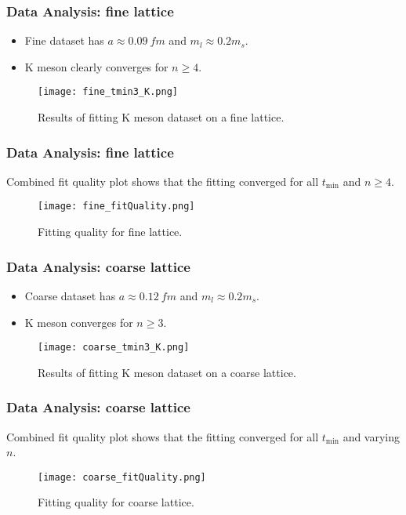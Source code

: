 \documentclass{beamer}
\begin{document}
\begin{frame}
    \frametitle{Data Analysis: fine lattice}
    \begin{itemize}
        \item Fine dataset has $a \approx \SI{0.09}{fm}$ and $m_l \approx 0.2 m_s$.
        \item K meson clearly converges for $n \geq 4$.
    \end{itemize}
    \begin{figure}
        \centering
        \texttt{[image: fine\_tmin3\_K.png]}
        \caption{Results of fitting K meson dataset on a fine lattice.}
    \end{figure}
\end{frame}

\begin{frame}
    \frametitle{Data Analysis: fine lattice}
    Combined fit quality plot shows that the fitting converged for all $t_\mathrm{min}$ and $n \geq 4$.
    \begin{figure}
        \centering
        \texttt{[image: fine\_fitQuality.png]}
        \caption{Fitting quality for fine lattice.}
    \end{figure}
\end{frame}

\begin{frame}
    \frametitle{Data Analysis: coarse lattice}
    \begin{itemize}
        \item Coarse dataset has $a \approx \SI{0.12}{fm}$ and $m_l \approx 0.2 m_s$.
        \item K meson converges for $n \geq 3$.
    \end{itemize}
    \begin{figure}
        \centering
        \texttt{[image: coarse\_tmin3\_K.png]}
        \caption{Results of fitting K meson dataset on a coarse lattice.}
    \end{figure}
\end{frame}

\begin{frame}
    \frametitle{Data Analysis: coarse lattice}
    Combined fit quality plot shows that the fitting converged for all $t_\mathrm{min}$ and varying $n$.
    \begin{figure}
        \centering
        \texttt{[image: coarse\_fitQuality.png]}
        \caption{Fitting quality for coarse lattice.}
    \end{figure}
\end{frame}
\end{document}
